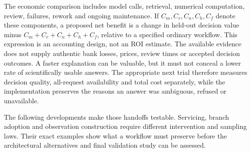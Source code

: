 The economic comparison includes model calls, retrieval, numerical computation,
review, failures, rework and ongoing maintenance. If $C_m,C_r,C_n,C_h,C_f$ denote
these components, a proposed net benefit is a change in held-out decision value
minus $C_m+C_r+C_n+C_h+C_f$, relative to a specified ordinary workflow.
This expression is an accounting design, not an ROI estimate. The available
evidence does not supply authentic bank losses, prices, review times or accepted
decision outcomes. A faster explanation can be valuable, but it must not conceal
a lower rate of scientifically usable answers. The appropriate next trial
therefore measures decision quality, all-request availability and total cost
separately, while the implementation preserves the reasons an answer was
ambiguous, refused or unavailable.

The following developments make those handoffs testable. Servicing, branch
adoption and observation construction require different intervention and
sampling laws. Their exact examples show what a workflow must preserve before
the architectural alternatives and final validation study can be assessed.
